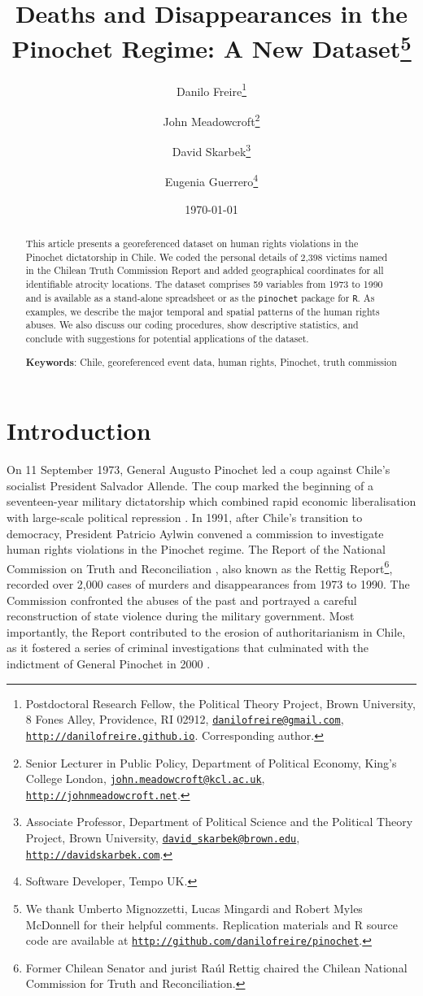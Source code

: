 \documentclass[12pt,a4paper,]{article}
\title{\textbf{Deaths and Disappearances in the Pinochet Regime: A New Dataset}\thanks{We thank Umberto Mignozzetti, Lucas Mingardi and Robert Myles McDonnell
for their helpful comments. Replication materials and R source code are
available at
\href{http://github.com/danilofreire/pinochet}{\texttt{http://github.com/danilofreire/pinochet}}.}}
\author{Danilo Freire\footnote{Postdoctoral Research Fellow, the Political
  Theory Project, Brown University, 8 Fones Alley, Providence, RI 02912,
  \href{mailto:danilofreire@gmail.com}{\texttt{danilofreire@gmail.com}},
  \href{http://danilofreire.github.io}{\texttt{http://danilofreire.github.io}}.
  Corresponding author.} \and John Meadowcroft\footnote{Senior Lecturer in Public Policy, Department
  of Political Economy, King's College London,
  \href{mailto:john.meadowcroft@kcl.ac.uk}{\texttt{john.meadowcroft@kcl.ac.uk}},
  \href{http://johnmeadowcroft.net}{\texttt{http://johnmeadowcroft.net}}.} \and David Skarbek\footnote{Associate Professor, Department of Political
  Science and the Political Theory Project, Brown University,
  \href{david_skarbek@brown.edu}{\texttt{david\_skarbek@brown.edu}},
  \href{http://davidskarbek.com}{\texttt{http://davidskarbek.com}}.} \and Eugenia Guerrero\footnote{Software Developer, Tempo UK.}}
\date{\today}
\begin{document}
\maketitle

\begin{abstract}
\noindent This article presents a georeferenced dataset on human rights violations
in the Pinochet dictatorship in Chile. We coded the personal details of
2,398 victims named in the Chilean Truth Commission Report and added
geographical coordinates for all identifiable atrocity locations. The
dataset comprises 59 variables from 1973 to 1990 and is available as a
stand-alone spreadsheet or as the \texttt{pinochet} package for
\texttt{R}. As examples, we describe the major temporal and spatial
patterns of the human rights abuses. We also discuss our coding
procedures, show descriptive statistics, and conclude with suggestions
for potential applications of the dataset.
\vspace{.5cm}

\noindent \textbf{Keywords}: Chile, georeferenced event data, human rights, Pinochet, truth
commission
\vspace{.25cm}

\end{abstract}
\newpage

\hypertarget{introduction}{%
\section{\texorpdfstring{Introduction\label{sec:intro}}{Introduction}}\label{introduction}}

\setlength{\parindent}{1cm}
\setlength{\parskip}{0pt}

On 11 September 1973, General Augusto Pinochet led a coup against
Chile's socialist President Salvador Allende. The coup marked the
beginning of a seventeen-year military dictatorship which combined rapid
economic liberalisation with large-scale political repression
\citep{valdes1995pinochet}. In 1991, after Chile's transition to
democracy, President Patricio Aylwin convened a commission to
investigate human rights violations in the Pinochet regime. The Report
of the National Commission on Truth and Reconciliation
\citeyearpar{report1991}, also known as the Rettig Report\footnote{Former
  Chilean Senator and jurist Raúl Rettig chaired the Chilean National
  Commission for Truth and Reconciliation.}, recorded over 2,000 cases
of murders and disappearances from 1973 to 1990. The Commission
confronted the abuses of the past and portrayed a careful reconstruction
of state violence during the military government. Most importantly, the
Report contributed to the erosion of authoritarianism in Chile, as it
fostered a series of criminal investigations that culminated with the
indictment of General Pinochet in 2000 \citep[ 26]{brahm2007uncovering}.
\end{document}
